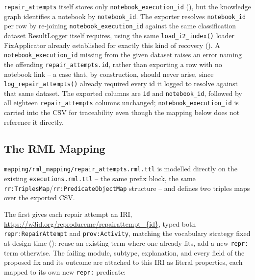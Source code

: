 \texttt{repair\_attempts} itself stores only \texttt{notebook\_execution\_id}
(), but the knowledge graph identifies a notebook
by \texttt{notebook\_id}. The exporter resolves \texttt{notebook\_id} per row
by re-joining \texttt{notebook\_execution\_id} against the same
classification dataset ResultLogger itself requires, using the same
\texttt{load\_i2\_index()} loader FixApplicator already established for
exactly this kind of recovery (). A
\texttt{notebook\_execution\_id} missing from the given dataset raises an
error naming the offending \texttt{repair\_attempts.id}, rather than
exporting a row with no notebook link -- a case that, by construction,
should never arise, since \texttt{log\_repair\_attempts()} already required
every id it logged to resolve against that same dataset. The exported
columns are \texttt{id} and \texttt{notebook\_id}, followed by all eighteen
\texttt{repair\_attempts} columns unchanged; \texttt{notebook\_execution\_id}
is carried into the CSV for traceability even though the mapping below does
not reference it directly.

\subsection{The RML Mapping}
\label{sec:m-resultlogger-rml}

\texttt{mapping/rml\_mapping/\allowbreak repair\_attempts.rml.ttl} is modelled
directly on the existing \texttt{executions.rml.ttl} -- the same prefix
block, the same \texttt{rr:TriplesMap}/\allowbreak\texttt{rr:PredicateObjectMap}
structure -- and defines two triples maps over the exported CSV.

The first gives each repair attempt an IRI,
\url{https://w3id.org/reproduceme/repairattempt_{id}}, typed both
\texttt{repr:RepairAttempt} and \texttt{prov:Activity}, matching the
vocabulary strategy fixed at design time (): reuse an
existing term where one already fits, add a new \texttt{repr:} term
otherwise. The failing module, subtype, explanation, and every field of the
proposed fix and its outcome are attached to this IRI as literal
properties, each mapped to its own new \texttt{repr:} predicate:

